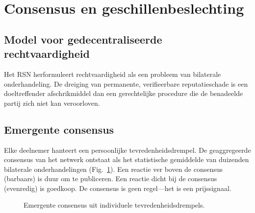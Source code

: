 \documentclass[11pt,a4paper,twocolumn]{article}
\begin{document}
\section{Consensus en geschillenbeslechting}

\subsection{Model voor gedecentraliseerde rechtvaardigheid}

Het RSN herformuleert rechtvaardigheid als een probleem van bilaterale onderhandeling. De dreiging van permanente, verifieerbare reputatieschade is een doeltreffender afschrikmiddel dan een gerechtelijke procedure die de benadeelde partij zich niet kan veroorloven.

\subsection{Emergente consensus}

Elke deelnemer hanteert een persoonlijke tevredenheidsdrempel. De geaggregeerde consensus van het netwerk ontstaat als het statistische gemiddelde van duizenden bilaterale onderhandelingen (Fig.~\ref{fig:consensus}). Een reactie ver boven de consensus (barbaars) is duur om te publiceren. Een reactie dicht bij de consensus (evenredig) is goedkoop. De consensus is geen regel---het is een prijssignaal.

\begin{figure}[ht]
\centering
{}
\caption{Emergente consensus uit individuele tevredenheidsdrempels.}
\label{fig:consensus}
\end{figure}
\end{document}
